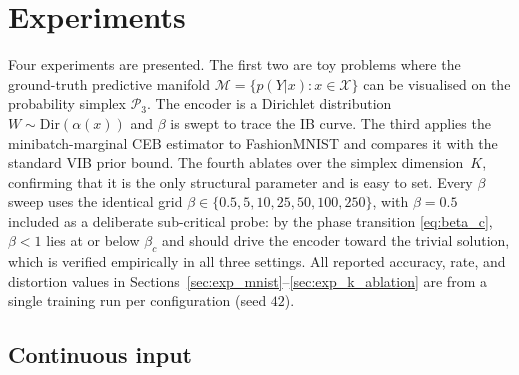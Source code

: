 \documentclass[11pt]{article}
\begin{document}


\section{Experiments}
\label{sec:experiments}

Four experiments are presented.
The first two are toy problems where the ground-truth predictive
manifold $\mathcal{M}=\{p(Y|x):x\in\mathcal{X}\}$ can be visualised
on the probability simplex $\mathcal{P}_3$. The encoder is a Dirichlet
distribution $W\sim\mathrm{Dir}(\alpha(x))$ and $\beta$ is swept to
trace the IB curve.
The third applies the minibatch-marginal CEB estimator to FashionMNIST
and compares it with the standard VIB prior bound.
The fourth ablates over the simplex dimension~$K$, confirming that it
is the only structural parameter and is easy to set.
Every $\beta$ sweep uses the identical grid
$\beta\in\{0.5,5,10,25,50,100,250\}$, with $\beta=0.5$ included as a
deliberate sub-critical probe: by the phase transition
\eqref{eq:beta_c}, $\beta<1$ lies at or below $\beta_c$ and should
drive the encoder toward the trivial solution, which is verified
empirically in all three settings.
All reported accuracy, rate, and distortion values in
Sections~\ref{sec:exp_mnist}--\ref{sec:exp_k_ablation} are from a
single training run per configuration (seed $42$).

\subsection{Continuous input}
\label{sec:exp_cont}
\end{document}
